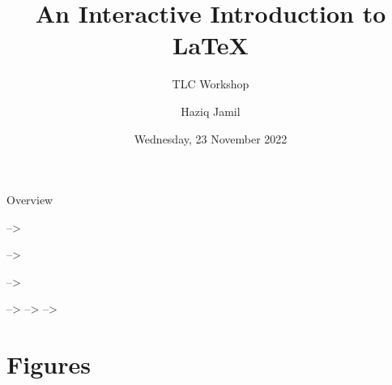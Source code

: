 \documentclass[,aspectratio=43]{beamer}
\author{Haziq Jamil}
\title{An Interactive Introduction to \LaTeX}
\subtitle{TLC Workshop}
\institute{Mathematical Sciences, Faculty of Science, UBD\\
\url{https://haziqj.ml}}
\date{Wednesday, 23 November 2022}
\begin{document}
\begin{frame}
	\titlepage
\end{frame}

\begin{frame}[allowframebreaks=0.8]{Overview}
    \begin{multicols}{2}
  \tableofcontents
  \end{multicols}
  \end{frame}


\begin{frame}
--\textgreater{}

--\textgreater{}

--\textgreater{}

--\textgreater{} --\textgreater{} --\textgreater{}
\end{frame}

\hypertarget{figures}{%
\section{Figures}\label{figures}}
\end{document}
